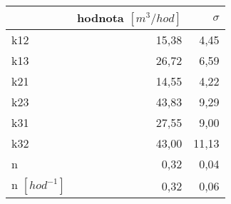 \begin{tabular}{lrr}
\toprule
{} &  hodnota $\left[\si{m^3/hod}\right]$ &  $\sigma$ \\
\midrule
k12                 &                                15,38 &      4,45 \\
k13                 &                                26,72 &      6,59 \\
k21                 &                                14,55 &      4,22 \\
k23                 &                                43,83 &      9,29 \\
k31                 &                                27,55 &      9,00 \\
k32                 &                                43,00 &     11,13 \\
n                   &                                 0,32 &      0,04 \\
n $[\si{hod^{-1}}]$ &                                 0,32 &      0,06 \\
\bottomrule
\end{tabular}
